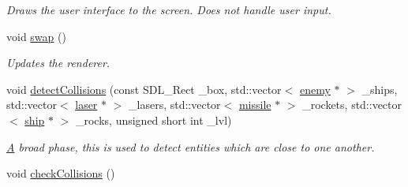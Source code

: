 \begin{DoxyCompactItemize}
\begin{DoxyCompactList}\small\item\em Draws the user interface to the screen. Does not handle user input. \end{DoxyCompactList}\item 
\hypertarget{classuniverse_a62ca92c3e40069cbf3a411c1a4a696b1}{void \hyperlink{classuniverse_a62ca92c3e40069cbf3a411c1a4a696b1}{swap} ()}\label{classuniverse_a62ca92c3e40069cbf3a411c1a4a696b1}

\begin{DoxyCompactList}\small\item\em Updates the renderer. \end{DoxyCompactList}\item 
void \hyperlink{classuniverse_afd96a7a54d67a2f87a6c4542fb974f53}{detect\-Collisions} (const S\-D\-L\-\_\-\-Rect \-\_\-box, std\-::vector$<$ \hyperlink{classenemy}{enemy} $\ast$ $>$ \-\_\-ships, std\-::vector$<$ \hyperlink{classlaser}{laser} $\ast$ $>$ \-\_\-lasers, std\-::vector$<$ \hyperlink{classmissile}{missile} $\ast$ $>$ \-\_\-rockets, std\-::vector$<$ \hyperlink{classship}{ship} $\ast$ $>$ \-\_\-rocks, unsigned short int \-\_\-lvl)
\begin{DoxyCompactList}\small\item\em \hyperlink{struct_a}{A} broad phase, this is used to detect entities which are close to one another. \end{DoxyCompactList}\item 
\hypertarget{classuniverse_a5ca840e2d9777dd97867d360ae4d089f}{void \hyperlink{classuniverse_a5ca840e2d9777dd97867d360ae4d089f}{check\-Collisions} ()}\label{classuniverse_a5ca840e2d9777dd97867d360ae4d089f}


\end{DoxyCompactItemize}
